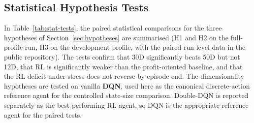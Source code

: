 \documentclass[preprint,review,authoryear,12pt]{elsarticle}
\begin{document}
\subsection{Statistical Hypothesis Tests}
\label{sec:stat-tests}

In Table~\ref{tab:stat-tests}, the paired statistical comparisons for the three
hypotheses of Section~\ref{sec:hypotheses} are summarised (H1 and H2 on the full-profile
run, H3 on the development profile, with the paired run-level data in the public
repository). The tests confirm that 30D significantly beats 50D but not 12D, that RL is
significantly weaker than the profit-oriented baseline, and that the RL deficit under
stress does not reverse by episode end. The dimensionality hypotheses are tested on
vanilla \textbf{DQN}, used here as the canonical discrete-action reference agent for the
controlled state-size comparison. Double-DQN is reported separately as the
best-performing RL agent, so DQN is the appropriate reference agent for the paired tests.
\end{document}
